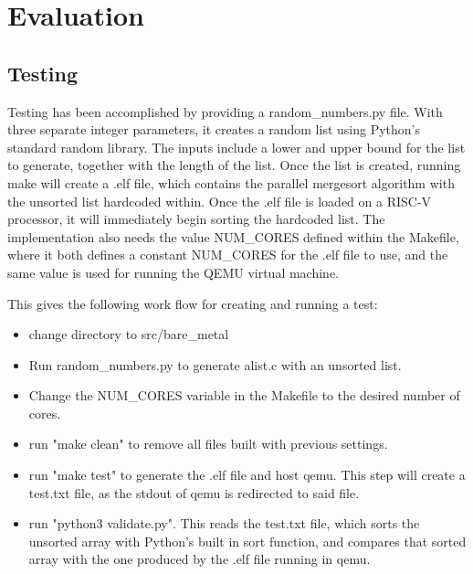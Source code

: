 \section{Evaluation}
\subsection{Testing}
Testing has been accomplished by providing a random\_numbers.py file. With three
separate integer parameters, it creates a random list using Python's standard
random library. The inputs include a lower and upper bound for the list to
generate, together with the length of the list. Once the list is created,
running make will create a .elf file, which contains the parallel mergesort
algorithm with the unsorted list hardcoded within. Once the .elf file is loaded
on a RISC-V processor, it will immediately begin sorting the hardcoded list. The
implementation also needs the value NUM\_CORES defined within the Makefile, where
it both defines a constant NUM\_CORES for the .elf file to use, and the same
value is used for running the QEMU virtual machine.

This gives the following work flow for creating and running a test:
\begin{itemize}
  \item change directory to src/bare\_metal
  \item Run random\_numbers.py to generate alist.c with an unsorted list.
  \item Change the NUM\_CORES variable in the Makefile to the desired number of
    cores.
  \item run "make clean" to remove all files built with previous settings.
  \item run "make test" to generate the .elf file and host qemu. This step will
    create a test.txt file, as the stdout of qemu is redirected to said file.
  \item run "python3 validate.py". This reads the test.txt file, which sorts the
    unsorted array with Python's built in sort function, and compares that sorted
    array with the one produced by the .elf file running in qemu.
\end{itemize}

